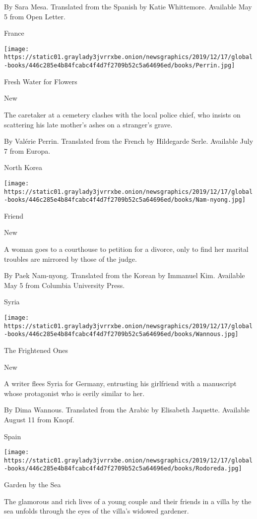  By Sara Mesa. Translated from the Spanish by Katie Whittemore.
Available May 5 from Open Letter.

France

\texttt{[image: https://static01.graylady3jvrrxbe.onion/newsgraphics/2019/12/17/global-books/446c285e4b84fcabc4f4d7f2709b52c5a64696ed/books/Perrin.jpg]}

Fresh Water for Flowers

New

The caretaker at a cemetery clashes with the local police chief, who
insists on scattering his late mother's ashes on a stranger's grave.

 By Valérie Perrin. Translated from the French by Hildegarde Serle.
Available July 7 from Europa.

North Korea

\texttt{[image: https://static01.graylady3jvrrxbe.onion/newsgraphics/2019/12/17/global-books/446c285e4b84fcabc4f4d7f2709b52c5a64696ed/books/Nam-nyong.jpg]}

Friend

New

A woman goes to a courthouse to petition for a divorce, only to find her
marital troubles are mirrored by those of the judge.

 By Paek Nam-nyong. Translated from the Korean by Immanuel Kim.
Available May 5 from Columbia University Press.

Syria

\texttt{[image: https://static01.graylady3jvrrxbe.onion/newsgraphics/2019/12/17/global-books/446c285e4b84fcabc4f4d7f2709b52c5a64696ed/books/Wannous.jpg]}

The Frightened Ones

New

A writer flees Syria for Germany, entrusting his girlfriend with a
manuscript whose protagonist who is eerily similar to her.

 By Dima Wannous. Translated from the Arabic by Elisabeth Jaquette.
Available August 11 from Knopf.

Spain

\texttt{[image: https://static01.graylady3jvrrxbe.onion/newsgraphics/2019/12/17/global-books/446c285e4b84fcabc4f4d7f2709b52c5a64696ed/books/Rodoreda.jpg]}

Garden by the Sea

The glamorous and rich lives of a young couple and their friends in a
villa by the sea unfolds through the eyes of the villa's widowed
gardener.


